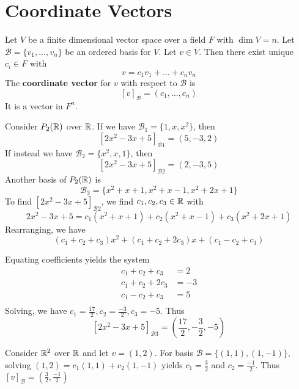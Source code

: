 \documentclass{article}
\begin{document}
\section{Coordinate Vectors}
\begin{definition}
  Let $V$ be a finite dimensional vector space over a field $F$ with $\dim V = n$. Let $\mathcal{B} = \{v_1, \ldots, v_n\}$ be an ordered basis for $V$. Let $v \in V$. Then there exist unique $c_i \in F$ with \[
    v = c_1v_1 + \dots + c_nv_n
  \]
  The \textbf{coordinate vector} for $v$ with respect to $\mathcal{B}$ is \[
    [v]_\mathcal{B} = (c_1, \ldots, c_n)
  \]
  It is a vector in $F^n$.
\end{definition}
\begin{example}
  Consider $P_2(\mathbb{R})$ over $\mathbb{R}$. If we have $\mathcal{B}_1 = \{1, x, x^2\}$, then \[
    [2x^2-3x+5]_{\mathcal{B}1} = (5, -3, 2)
  \]
  If instead we have $\mathcal{B}_2 = \{x^2, x, 1\}$, then \[
    [2x^2 - 3x + 5]_{\mathcal{B}2} = (2, -3, 5)
  \]
  Another basis of $P_2(\mathbb{R})$ is \[
    \mathcal{B}_3 = \{x^2 + x + 1, x^2 + x - 1, x^2 + 2x + 1\}
  \]
  To find $[2x^2 - 3x + 5]_{\mathcal{B}2}$, we find $c_1, c_2, c_3 \in \mathbb{R}$ with \[
    2x^2 -3x+5 = c_1(x^2 + x + 1) + c_2(x^2 + x - 1) + c_3(x^2 + 2x + 1)
  \]
  Rearranging, we have \[
    (c_1 + c_2 + c_3)x^2 + (c_1 + c_2 + 2c_3)x + (c_1 - c_2 + c_3)
  \]

  Equating coefficients yields the system
  \begin{align*}
    c_1 + c_2 + c_3 &= 2\\
    c_1 + c_2 + 2c_3 &= -3\\
    c_1 - c_2 + c_3 &= 5\\
  \end{align*}
  Solving, we have $c_1 = \frac{17}{2}, c_2 = \frac{-3}{2}, c_3 = -5$. Thus \[
    [2x^2 - 3x + 5]_{\mathcal{B}3} = (\frac{17}{2}, -\frac{3}{2}, -5)
  \]
\end{example}
\begin{example}
  Consider $\mathbb{R}^2$ over $\mathbb{R}$ and let $v = (1, 2)$.
  For basis $\mathcal{B} = \{(1, 1), (1, -1)\}$, solving $(1, 2) = c_1(1, 1) + c_2(1, -1)$ yields $c_1 = \frac{3}{2}$ and $c_2 = \frac{-1}{2}$. Thus $[v]_\mathcal{B} = \left(\frac{3}{2}, \frac{-1}{2}\right)$
\end{example}
\end{document}
